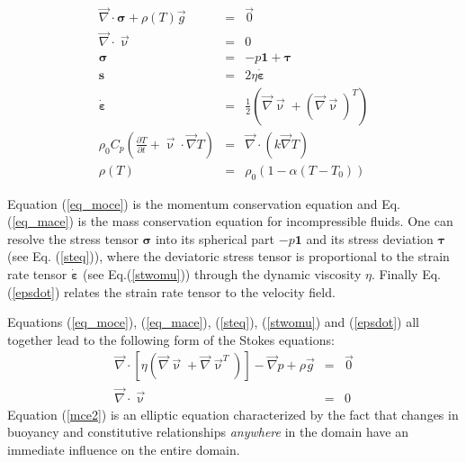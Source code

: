 \begin{eqnarray}
{\vec \nabla}\cdot {\bm \sigma} + \rho(T) {\vec g} &=& {\vec 0} \label{eq_moce}\\
{\vec \nabla}\cdot {\vec \upnu} &=& 0 \label{eq_mace}\\
{\bm \sigma} &=& -p {\bm 1} + {\bm \tau} \label{steq}\\
{\bm s} &=& 2 \eta \dot{\bm \varepsilon} \label{stwomu}\\
\dot{\bm \varepsilon}  &=& \frac{1}{2} \left( {\vec \nabla}{\vec \upnu} 
+ ({\vec \nabla}{\vec \upnu})^T  \right) \label{epsdot} \\
\rho_0 C_p \left( \frac{\partial T}{\partial t}  + {\vec \upnu}\cdot {\vec \nabla} T\right) 
&=& {\vec \nabla}\cdot (k {\vec \nabla}T)  \label{eqhte} \\
\rho(T) &=& \rho_0 (1 - \alpha (T-T_0)) 
\end{eqnarray}

Equation (\ref{eq_moce}) is the momentum conservation equation and 
Eq. (\ref{eq_mace}) is the mass conservation equation for incompressible fluids.
One can resolve the stress tensor ${\bm \sigma}$ into its spherical part $-p{\bm 1}$ and 
its stress deviation ${\bm \tau}$ (see Eq. (\ref{steq})), where the deviatoric stress tensor is 
proportional to the strain rate tensor $\dot{\bm \varepsilon}$ (see Eq.(\ref{stwomu})) through the 
dynamic viscosity $\eta$. 
Finally Eq. (\ref{epsdot}) relates the strain rate tensor to the velocity field.

Equations (\ref{eq_moce}), (\ref{eq_mace}), (\ref{steq}), (\ref{stwomu}) and (\ref{epsdot}) all 
together lead to the following form of the Stokes equations:
\begin{eqnarray}
{\vec \nabla}\cdot [\eta ({\vec\nabla} {\vec \upnu} + {\vec \nabla} {\vec \upnu}^T ) ] 
- {\vec \nabla}p + \rho {\vec g} &=& {\vec 0} \label{mce2} \\
{\vec \nabla}\cdot {\vec \upnu} &=& 0 \label{eq_mace2}
\end{eqnarray}
Equation (\ref{mce2}) is an elliptic equation characterized by the 
fact that changes in buoyancy and constitutive relationships {\it anywhere} 
in the domain have an immediate influence on the entire domain.

